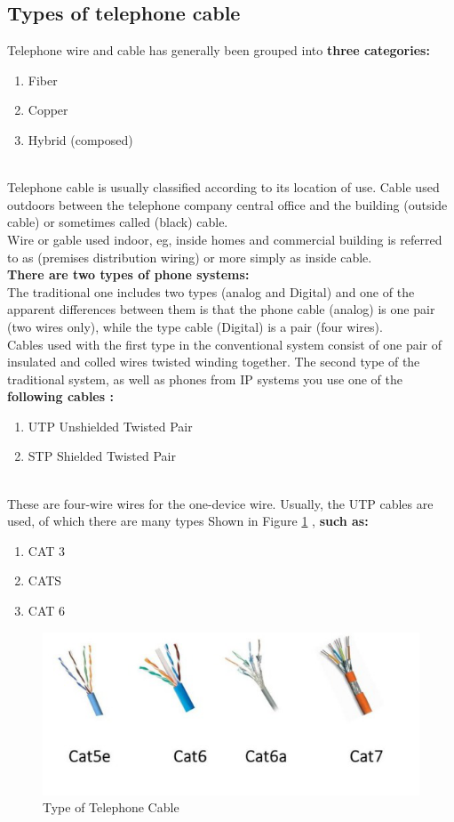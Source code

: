 \documentclass[12pt,fleqn]{book} %
\begin{document}
\subsection{Types of telephone cable}
Telephone wire and cable has generally been grouped into \textbf{three categories:}
\begin{enumerate}
    \item Fiber
    \item Copper
    \item Hybrid (composed)
\end{enumerate}
\\ Telephone cable is usually classified according to its location of use. Cable used outdoors between the telephone company central office and the building (outside cable) or sometimes called (black) cable.
\\ Wire or gable used indoor, eg, inside homes and commercial building is referred to as (premises distribution wiring) or more simply as inside cable.
\\ \textbf{There are two types of phone systems:}
\\ The traditional one includes two types (analog and Digital) and one of the apparent differences between them is that the phone cable (analog) is one pair (two wires only), while the type cable (Digital) is a pair (four wires).
\\ Cables used with the first type in the conventional system consist of one pair of insulated and colled wires twisted winding together. The second type of the traditional system, as well as phones from IP systems you use one of the \textbf{following cables :}
\begin{enumerate}
    \item UTP Unshielded Twisted Pair
    \item STP Shielded Twisted Pair
\end{enumerate}
\\ These are four-wire wires for the one-device wire. Usually, the UTP cables are used, of which there are many types Shown in Figure \ref{fig:hamdy 49} , \textbf{such as:}
\begin{enumerate}
    \item CAT 3
    \item CATS
    \item CAT 6
\end{enumerate}
 \begin{figure}[!h]
    \centering
    \includegraphics[width=0.5\linewidth]{hamdy 49.png}
    \caption{Type of Telephone Cable}
    \label{fig:hamdy 49}
    \end{figure}
\end{document}
